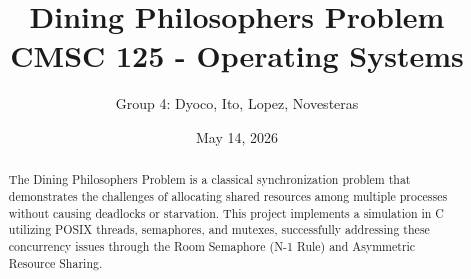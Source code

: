 \documentclass[11pt,a4paper]{article}
\title{\textbf{Dining Philosophers Problem}\\
\large CMSC 125 - Operating Systems}
\author{Group 4: Dyoco, Ito, Lopez, Novesteras}
\date{May 14, 2026}
\begin{document}
\maketitle

\begin{abstract}
The Dining Philosophers Problem is a classical synchronization problem that demonstrates the challenges of allocating shared resources among multiple processes without causing deadlocks or starvation. This project implements a simulation in C utilizing POSIX threads, semaphores, and mutexes, successfully addressing these concurrency issues through the Room Semaphore (N-1 Rule) and Asymmetric Resource Sharing.
\end{abstract}

\vspace{0.5cm}
\end{document}
